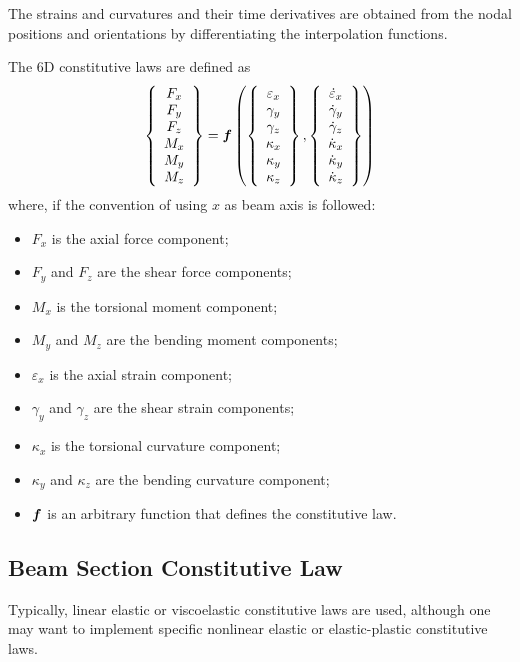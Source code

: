The strains and curvatures and their time derivatives are obtained 
from the nodal positions and orientations by differentiating
the interpolation functions.

The 6D constitutive laws are defined as
\begin{displaymath}
	\left\{ \begin{array}{c} 
		F_x \\
		F_y \\
		F_z \\
		M_x \\
		M_y \\
		M_z
	 \end{array} \right\} = \boldsymbol{f}\left( 
		\left\{ \begin{array}{c} 
			\varepsilon_x \\
			\gamma_y \\
			\gamma_z \\
			\kappa_x \\
			\kappa_y \\
			\kappa_z
		 \end{array} \right\},
		\left\{ \begin{array}{c} 
			\dot{\varepsilon}_x \\
			\dot{\gamma}_y \\
			\dot{\gamma}_z \\
			\dot{\kappa}_x \\
			\dot{\kappa}_y \\
			\dot{\kappa}_z
		 \end{array} \right\}
	 \right)
\end{displaymath}
where, if the convention of using $x$ as beam axis is followed:
\begin{itemize}
\item $F_x$ is the axial force component;
\item $F_y$ and $F_z$ are the shear force components;
\item $M_x$ is the torsional moment component;
\item $M_y$ and $M_z$ are the bending moment components;
\item $\varepsilon_x$ is the axial strain component;
\item $\gamma_y$ and $\gamma_z$ are the shear strain components;
\item $\kappa_x$ is the torsional curvature component;
\item $\kappa_y$ and $\kappa_z$ are the bending curvature component;
\item $\boldsymbol{f}$ is an arbitrary function that defines the constitutive law.
\end{itemize}



\subsection{Beam Section Constitutive Law}
Typically, linear elastic or viscoelastic constitutive laws are used,
although one may want to implement specific nonlinear elastic
or elastic-plastic constitutive laws.



